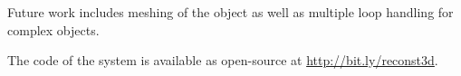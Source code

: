 \documentclass[letterpaper, 10 pt, conference]{ieeeconf}  %
\begin{document}
Future work includes meshing of the object as well as multiple loop handling for complex objects.

The code of the system is available as open-source at
\href{http://bit.ly/reconst3d}{http://bit.ly/reconst3d}.

\addtolength{\textheight}{-8cm}   %




\end{document}
